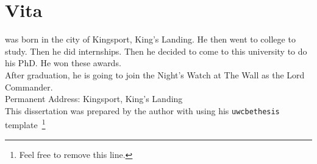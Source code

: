 




\begingroup
\let\clearpage\relax
\let\cleardoublepage\relax
\let\cleardoublepage\relax



\chapter*{Vita}

\myName{} was born in the city of Kingsport, King's Landing. 
He then went to college to study. Then he did internships. 
Then he decided to come to this university to do his PhD. 
He won these awards. \\

After graduation, he is going to join the Night's Watch at 
The Wall as the Lord Commander. \\

\vspace{1ex}
\noindent Permanent Address: Kingsport, King's Landing\\

\vspace{1ex}
\noindent This dissertation was prepared by the author with \LaTeXe\xspace using his \texttt{uwcbethesis} template~\footnote{Feel free to remove this line.}



\endgroup 

\cleardoublepage